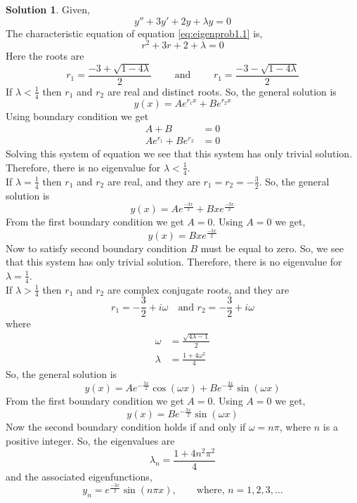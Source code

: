 \documentclass[12pt,a4paper]{article}
\theoremstyle{remark}
\theoremstyle{definition}
\newtheorem*{soln}{Solution}
\begin{document}
\begin{soln}
    Given,
    \begin{equation}
        \label{eq:eigenprob1.1}
        y''+3y'+2y+\lambda y=0
    \end{equation}
    The characteristic equation of equation \eqref{eq:eigenprob1.1} is,
    \[
        r^2+3r+2+\lambda =0
    \]
    Here the roots are
    \[
        r_1=\frac{-3+\sqrt{1-4\lambda}}{2}\qquad\text{ and }\qquad r_1=\frac{-3-\sqrt{1-4\lambda}}{2}
    \]
    If $ \lambda<\frac{1}{4}  $ then $ r_1 $ and $ r_2 $ are real and distinct roots. So, the general solution is
    \[
        y(x)=Ae^{r_1 x}+Be^{r_2 x}
    \]
    Using boundary condition we get
    \begin{align*}
        A+B                 & =0 \\
        Ae^{r_1 }+Be^{r_2 } & =0
    \end{align*}
    Solving this system of equation we see that this system has only trivial solution. Therefore, there is no eigenvalue for $ \lambda<\frac{1}{4} $.\\

    If $ \lambda=\frac{1}{4}  $ then $ r_1 $ and $ r_2 $ are real, and they are $ r_1=r_2=-\frac{3}{2} $. So, the general solution is
    \[
        y(x)=Ae^{\frac{-3x}{2}}+Bxe^{\frac{-3x}{2}}
    \]
    From the first boundary condition we get $ A=0 $. Using $ A=0 $ we get,
    \[
        y(x)=Bxe^{\frac{-3x}{2}}
    \]
    Now to satisfy second boundary condition $ B $ must be equal to zero. So, we see that this system has only trivial solution. Therefore, there is no eigenvalue for $ \lambda=\frac{1}{4} $.\\


    If $ \lambda>\frac{1}{4}  $ then $ r_1 $ and $ r_2 $ are complex conjugate roots, and they are
    \[
        r_1=-\frac{3}{2}+i\omega\quad \text{and }r_2=-\frac{3}{2}+i\omega
    \]
    where
    \begin{align*}
        \omega  & =\frac{\sqrt{4\lambda-1}}{2} \\
        \lambda & =\frac{1+4\omega^2}{4}
    \end{align*}
    So, the general solution is
    \[
        y(x)=Ae^{-\frac{3x}{2}}\cos(\omega x)+Be^{-\frac{3x}{2}}\sin(\omega x)
    \]
    From the first boundary condition we get $ A=0 $. Using $ A=0 $ we get,
    \[
        y(x)=Be^{-\frac{3x}{2}}\sin(\omega x)
    \]
    Now the second boundary condition holds if and only if $ \omega=n\pi $, where $ n $ is a positive integer. So, the eigenvalues are
    \[
        \lambda_n=\frac{1+4n^2 \pi^2}{4}
    \]
    and the associated eigenfunctions,
    \[
        y_n=e^{\frac{-3x}{2}}\sin(n\pi x),\qquad\text{where, } n=1,2,3,\dots
    \]
\end{soln}
\end{document}
